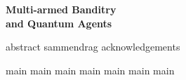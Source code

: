 \documentclass[
    12pt,
    a4paper,
    egregdoesnotlikesansseriftitles,
    headings=twolinechapter,
    listof=totoc,
]{scrbook}
\begin{document}
\frontmatter
\begin{titlepage}
    \centering
    \vspace*{7cm}
    \Huge
    \textbf{Multi-armed Banditry \\ and Quantum Agents}
\end{titlepage}

\addtocounter{tocdepth}{-1}
\tableofcontents


{abstract}
{sammendrag}
{acknowledgements}


\mainmatter
\cleardoublepage

{main}
{main}
{main}
{main}
{main}
{main}
{main}

\backmatter
\printbibliography[
    heading=bibintoc,
    title={References}
]

\cleardoublepage
\listoffigures

\cleardoublepage
\listoftables
\end{document}

